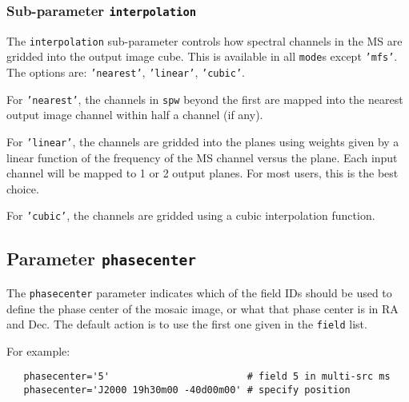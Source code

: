
\subsubsection{Sub-parameter {\tt interpolation} }
\label{section:im.pars.mode.interpolation}

The {\tt interpolation} sub-parameter controls how spectral channels
in the MS are gridded into the output image cube.  This is available 
in all {\tt mode}s except {\tt 'mfs'}.  The options are: 
{\tt 'nearest'}, {\tt 'linear'}, {\tt 'cubic'}.

For {\tt 'nearest'}, the channels in {\tt spw} beyond the first are
mapped into the nearest output image channel within half a channel (if
any).

For {\tt 'linear'}, the channels are gridded into the planes using
weights given by a linear function of the frequency of the MS channel
versus the plane.  Each input channel will be mapped to 1 or 2 output
planes.  For most users, this is the best choice.

For {\tt 'cubic'}, the channels are gridded using a cubic
interpolation function.  

\subsection{Parameter {\tt phasecenter} }
\label{section:im.pars.phasecenter}

The {\tt phasecenter} parameter indicates which of the field IDs 
should be used to define the phase center of the mosaic image,
or what that phase center is in RA and Dec.
The default action is to use the first one given in the 
{\tt field} list.

For example:
\small
\begin{verbatim}
   phasecenter='5'                        # field 5 in multi-src ms
   phasecenter='J2000 19h30m00 -40d00m00' # specify position
\end{verbatim}
\normalsize

